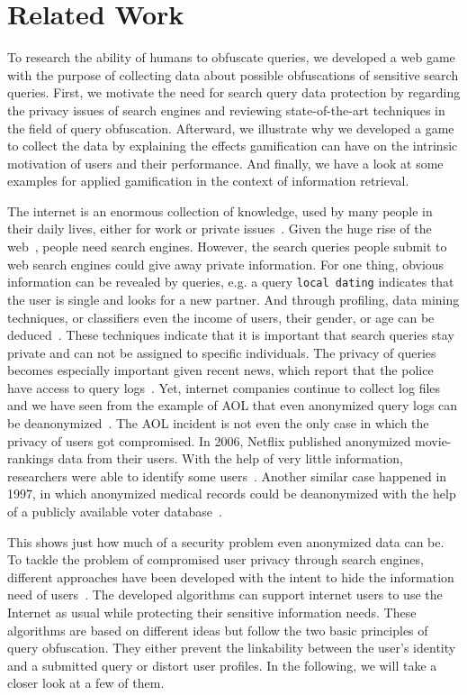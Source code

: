 \chapter{Related Work}
To research the ability of humans to obfuscate queries, we developed a web game with the purpose of collecting data about possible obfuscations of sensitive search queries. First, we motivate the need for search query data protection by regarding the privacy issues of search engines and reviewing state-of-the-art techniques in the field of query obfuscation. Afterward, we illustrate why we developed a game to collect the data by explaining the effects gamification can have on the intrinsic motivation of users and their performance. And finally, we have a look at some examples for applied gamification in the context of information retrieval.\par
The internet is an enormous collection of knowledge, used by many people in their daily lives, either for work or private issues~\cite{dailyInternet}. Given the huge rise of the web~\cite{internetUsage, internetUsage2, internetWorld}, people need search engines. However, the search queries people submit to web search engines could give away private information.
For one thing, obvious information can be revealed by queries, e.g. a query \texttt{local dating} indicates that the user is single and looks for a new partner. And through profiling, data mining techniques, or classifiers even the income of users, their gender, or age can be deduced~\cite{trackmenotWeakness, classifierPrivacyAttack}. These techniques indicate that it is important that search queries stay private and can not be assigned to specific individuals. The privacy of queries becomes especially important given recent news, which report that the police have access to query logs~\cite{police}. Yet, internet companies continue to collect log files and we have seen from the example of AOL that even anonymized query logs can be deanonymized~\cite{aol}. The AOL incident is not even the only case in which the privacy of users got compromised. In 2006, Netflix published anonymized movie-rankings data from their users. With the help of very little information, researchers were able to identify some users~\cite{netflixPaper}. Another similar case happened in 1997, in which anonymized medical records could be deanonymized with the help of a publicly available voter database~\cite{privacyExamples}.\par
This shows just how much of a security problem even anonymized data can be. To tackle the problem of compromised user privacy through search engines, different approaches have been developed with the intent to hide the information need of users~\cite{arampatzis, trackmenot1, privateWebSearch, maikPaper, plausiblyDeniableSearch, knowledge, peer}. The developed algorithms can support internet users to use the Internet as usual while protecting their sensitive information needs. These algorithms are based on different ideas but follow the two basic principles of query obfuscation. They either prevent the linkability between the user's identity and a submitted query or distort user profiles. In the following, we will take a closer look at a few of them.\par

